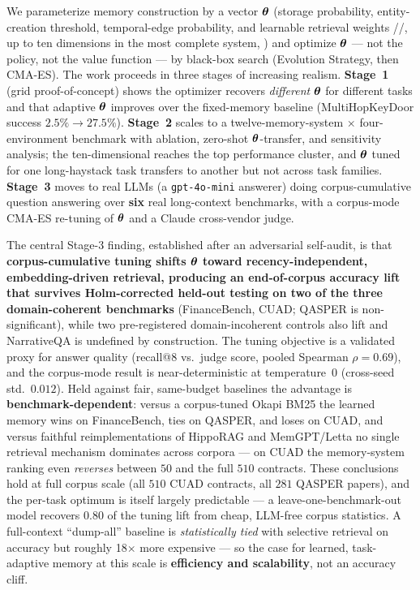 We parameterize memory construction by a vector $\boldsymbol{\theta}$ (storage
probability, entity-creation threshold, temporal-edge probability, and learnable
retrieval weights \wgraph{}/\wembed{}/\wrec{}, up to ten dimensions in the most
complete system, \Vfour{}) and optimize $\boldsymbol{\theta}$ --- not the policy, not the
value function --- by black-box search (Evolution Strategy, then CMA-ES). The
work proceeds in three stages of increasing realism. \textbf{Stage~1} (grid
proof-of-concept) shows the optimizer recovers \emph{different} $\boldsymbol{\theta}$ for
different tasks and that adaptive $\boldsymbol{\theta}$ improves over the fixed-memory
baseline (MultiHopKeyDoor success $2.5\% \rightarrow 27.5\%$). \textbf{Stage~2} scales to
a twelve-memory-system $\times$ four-environment benchmark with ablation,
zero-shot $\boldsymbol{\theta}$-transfer, and sensitivity analysis; the ten-dimensional
\Vfour{} reaches the top performance cluster, and $\boldsymbol{\theta}$ tuned for one
long-haystack task transfers to another but not across task families.
\textbf{Stage~3} moves to real LLMs (a \texttt{gpt-4o-mini} answerer)
doing corpus-cumulative question answering over \textbf{six} real long-context
benchmarks, with a corpus-mode CMA-ES re-tuning of $\boldsymbol{\theta}$ and a
Claude cross-vendor judge.

The central Stage-3 finding, established after an adversarial self-audit, is
that \textbf{corpus-cumulative tuning shifts $\boldsymbol{\theta}$ toward
recency-independent, embedding-driven retrieval, producing an end-of-corpus
accuracy lift that survives Holm-corrected held-out testing on two of the three
domain-coherent benchmarks} (FinanceBench, CUAD; QASPER is non-significant),
while two pre-registered domain-incoherent controls also lift and NarrativeQA is
undefined by construction. The tuning objective is a validated proxy for answer
quality (recall@8 vs.\ judge score, pooled Spearman $\rho=0.69$), and the
corpus-mode result is near-deterministic at temperature~0 (cross-seed
std.\ $0.012$). Held against fair, same-budget baselines the advantage is
\textbf{benchmark-dependent}: versus a corpus-tuned Okapi BM25 the learned memory
wins on FinanceBench, ties on QASPER, and loses on CUAD, and versus faithful
reimplementations of HippoRAG and MemGPT/Letta no single retrieval mechanism
dominates across corpora --- on CUAD the memory-system ranking even
\emph{reverses} between $50$ and the full $510$ contracts. These conclusions hold
at full corpus scale (all $510$ CUAD contracts, all $281$ QASPER papers), and the
per-task optimum is itself largely predictable --- a leave-one-benchmark-out model
recovers $0.80$ of the tuning lift from cheap, LLM-free corpus statistics. A
full-context
``dump-all'' baseline is \emph{statistically tied} with selective retrieval on
accuracy but roughly 18$\times$ more expensive --- so the case for learned,
task-adaptive memory at this scale is \textbf{efficiency and scalability}, not an
accuracy cliff.
